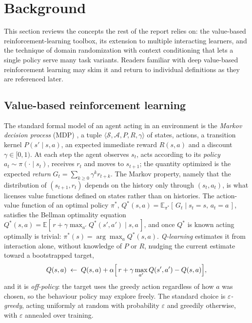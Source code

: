 \section{Background}
\label{sec:background}

This section reviews the concepts the rest of the report relies on: the
value-based reinforcement-learning toolbox, its extension to multiple interacting
learners, and the technique of domain randomization with context conditioning
that lets a single policy serve many task variants. Readers familiar with deep
value-based reinforcement learning may skim it and return to individual
definitions as they are referenced later.

\subsection{Value-based reinforcement learning}
\label{subsec:bg-dqn}

The standard formal model of an agent acting in an environment is the
\emph{Markov decision process} (MDP) \citep{sutton2018reinforcement}, a tuple
$\langle \mathcal{S}, \mathcal{A}, P, R, \gamma \rangle$ of states, actions, a
transition kernel $P(s' \mid s, a)$, an expected immediate reward $R(s,a)$ and a
discount $\gamma \in [0,1)$. At each step the agent observes $s_t$, acts
according to its \emph{policy} $a_t \sim \pi(\cdot \mid s_t)$, receives $r_t$ and
moves to $s_{t+1}$; the quantity optimized is the expected \emph{return}
$G_t = \sum_{k \ge 0} \gamma^k r_{t+k}$. The Markov property, namely that the
distribution of $(s_{t+1}, r_t)$ depends on the history only through
$(s_t, a_t)$, is what licenses value functions defined on states rather than on
histories. The action-value function of an optimal policy $\pi^*$,
$Q^*(s,a) = \mathbb{E}_{\pi^*}[\, G_t \mid s_t = s,\, a_t = a \,]$, satisfies the
Bellman optimality equation
$Q^*(s,a) = \mathbb{E}[\, r + \gamma \max_{a'} Q^*(s',a') \mid s,a \,]$, and once
$Q^*$ is known acting optimally is trivial: $\pi^*(s) = \arg\max_a Q^*(s,a)$.
\emph{Q-learning} \citep{watkins1992qlearning} estimates it from interaction
alone, without knowledge of $P$ or $R$, nudging the current estimate toward a
bootstrapped target,
\[
Q(s,a) \;\leftarrow\; Q(s,a) + \alpha \Bigl[\, r + \gamma \max_{a'} Q(s',a')
- Q(s,a) \Bigr],
\]
and it is \emph{off-policy}: the target uses the greedy action regardless of how
$a$ was chosen, so the behaviour policy may explore freely. The standard choice
is \emph{$\varepsilon$-greedy}, acting uniformly at random with probability
$\varepsilon$ and greedily otherwise, with $\varepsilon$ annealed over training.


